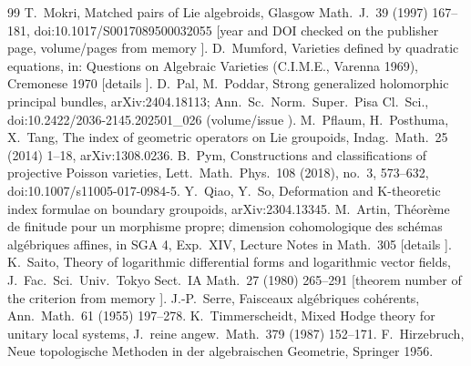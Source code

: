 \begin{thebibliography}{99}
 T.\ Mokri, Matched pairs of Lie algebroids, Glasgow Math.\ J.\ 39 (1997) 167--181, doi:10.1017/S0017089500032055 [year and DOI checked on the publisher page, volume/pages from memory \tQ].
 D.\ Mumford, Varieties defined by quadratic equations, in: Questions on Algebraic Varieties (C.I.M.E., Varenna 1969), Cremonese 1970 [details \tQ].
 D.\ Pal, M.\ Poddar, Strong generalized holomorphic principal bundles, arXiv:2404.18113; Ann.\ Sc.\ Norm.\ Super.\ Pisa Cl.\ Sci., doi:10.2422/2036-2145.202501\_026 (volume/issue \tQ).
 M.\ Pflaum, H.\ Posthuma, X.\ Tang, The index of geometric operators on Lie groupoids, Indag.\ Math.\ 25 (2014) 1--18, arXiv:1308.0236.
 B.\ Pym, Constructions and classifications of projective Poisson varieties, Lett.\ Math.\ Phys.\ 108 (2018), no.\ 3, 573--632, doi:10.1007/s11005-017-0984-5.
 Y.\ Qiao, Y.\ So, Deformation and K-theoretic index formulae on boundary groupoids, arXiv:2304.13345.
 M.\ Artin, Th\'eor\`eme de finitude pour un morphisme propre; dimension cohomologique des sch\'emas alg\'ebriques affines, in SGA 4, Exp.\ XIV, Lecture Notes in Math.\ 305 [details \tQ].
 K.\ Saito, Theory of logarithmic differential forms and logarithmic vector fields, J.\ Fac.\ Sci.\ Univ.\ Tokyo Sect.\ IA Math.\ 27 (1980) 265--291 [theorem number of the criterion from memory \tQ].
 J.-P.\ Serre, Faisceaux alg\'ebriques coh\'erents, Ann.\ Math.\ 61 (1955) 197--278.
 K.\ Timmerscheidt, Mixed Hodge theory for unitary local systems, J.\ reine angew.\ Math.\ 379 (1987) 152--171.
 F.\ Hirzebruch, Neue topologische Methoden in der algebraischen Geometrie, Springer 1956.
\end{thebibliography}
